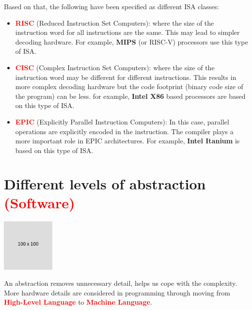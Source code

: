 \documentclass[
  14pt,
  a4paper,
  DIV=11,
  numbers=noendperiod,
  headinclude=true,
  footinclude=true]{scrreprt}
\begin{document}
\begin{tcolorbox}[colback=boxbodycol, colframe=boxbodycol]

Based on that, the following have been specified as different ISA
classes:

\begin{itemize}
\item
  \textcolor{red}{\textbf{RISC}} (Reduced Instruction Set Computers):
  where the size of the instruction word for all instructions are the
  same. This may lead to simpler decoding hardware. For example,
  \textbf{MIPS} (or RISC-V) processors use this type of ISA.
\item
  \textcolor{red}{\textbf{CISC}} (Complex Instruction Set Computers):
  where the size of the instruction word may be different for different
  instructions. This results in more complex decoding hardware but the
  code footprint (binary code size of the program) can be less. for
  example, \textbf{Intel X86} based processors are based on this type of
  ISA.
\item
  \textcolor{red}{\textbf{EPIC}} (Explicitly Parallel Instruction
  Computers): In this case, parallel operations are explicitly encoded
  in the instruction. The compiler plays a more important role in EPIC
  architectures. For example, \textbf{Intel Itanium} is based on this
  type of ISA.
\end{itemize}

\end{tcolorbox}

\section{\texorpdfstring{Different levels of abstraction
\textcolor{red}{(Software)}}{Different levels of abstraction (Software)}}\label{different-levels-of-abstraction-software}

\includegraphics{index_files/mediabag/FiKGhYhhIWJYiBgWIoaF.png}

\begin{tcolorbox}[colback=boxbodycol, colframe=boxheadcol]
An abstraction removes unnecessary detail, helps us cope with the
complexity. More hardware details are considered in programming through
moving from \textcolor{red}{\textbf{High-Level Language}} to
\textcolor{red}{\textbf{Machine Language}}.

\end{tcolorbox}
\end{document}
